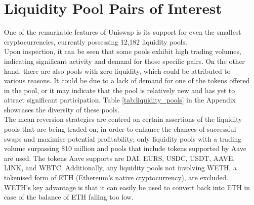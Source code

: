 \section{Liquidity Pool Pairs of Interest}
\label{sec:liquidity-pools}
One of the remarkable features of Uniswap is its support for even the smallest cryptocurrencies, currently possessing 12,182 liquidity pools.
\\[3mm]
Upon inspection, it can be seen that some pools exhibit high trading volumes, indicating significant activity and demand for those specific pairs. On the other hand, there are also pools with zero liquidity, which could be attributed to various reasons. It could be due to a lack of demand for one of the tokens offered in the pool, or it may indicate that the pool is relatively new and has yet to attract significant participation. Table \ref{tab:liquidity_pools} in the Appendix showcases the diversity of these pools.
\\[3mm]
The mean reversion strategies are centred on certain assertions of the liquidity pools that are being traded on, in order to enhance the chances of successful swaps and maximise potential profitability; only liquidity pools with a trading volume surpassing \$10 million and pools that include tokens supported by Aave are used. The tokens Aave supports are DAI, EURS, USDC, USDT, AAVE, LINK, and WBTC. Additionally, any liquidity pools not involving WETH, a tokenised form of ETH (Ethereum's native cryptocurrency), are excluded. WETH's key advantage is that it can easily be used to convert back into ETH in case of the balance of ETH falling too low.

